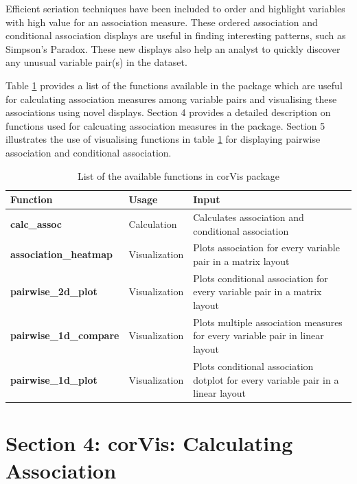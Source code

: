 Efficient seriation techniques have been included to order and highlight
variables with high value for an association measure. These ordered
association and conditional association displays are useful in finding
interesting patterns, such as Simpson's Paradox. These new displays also
help an analyst to quickly discover any unusual variable pair(s) in the
dataset.

Table \ref{tab:function-corVis} provides a list of the functions
available in the package which are useful for calculating association
measures among variable pairs and visualising these associations using
novel displays. Section 4 provides a detailed description on functions
used for calcuating association measures in the package. Section 5
illustrates the use of visualising functions in table
\ref{tab:function-corVis} for displaying pairwise association and
conditional association.

\begin{Schunk}
\begin{table}

\caption{\label{tab:function-corVis}List of the available functions in corVis package}
\centering
\begin{tabular}[t]{>{}lll}
\toprule
Function & Usage & Input\\
\midrule
\textbf{calc\_assoc} & Calculation & Calculates association and conditional association\\
\textbf{association\_heatmap} & Visualization & Plots association for every variable pair in a matrix layout\\
\textbf{pairwise\_2d\_plot} & Visualization & Plots conditional association for every variable pair in a matrix layout\\
\textbf{pairwise\_1d\_compare} & Visualization & Plots multiple association measures for every variable pair in linear layout\\
\textbf{pairwise\_1d\_plot} & Visualization & Plots conditional association dotplot for every variable pair in a linear layout\\
\bottomrule
\end{tabular}
\end{table}

\end{Schunk}

\hypertarget{section-4-corvis-calculating-association}{%
\section{Section 4: corVis: Calculating
Association}\label{section-4-corvis-calculating-association}}

